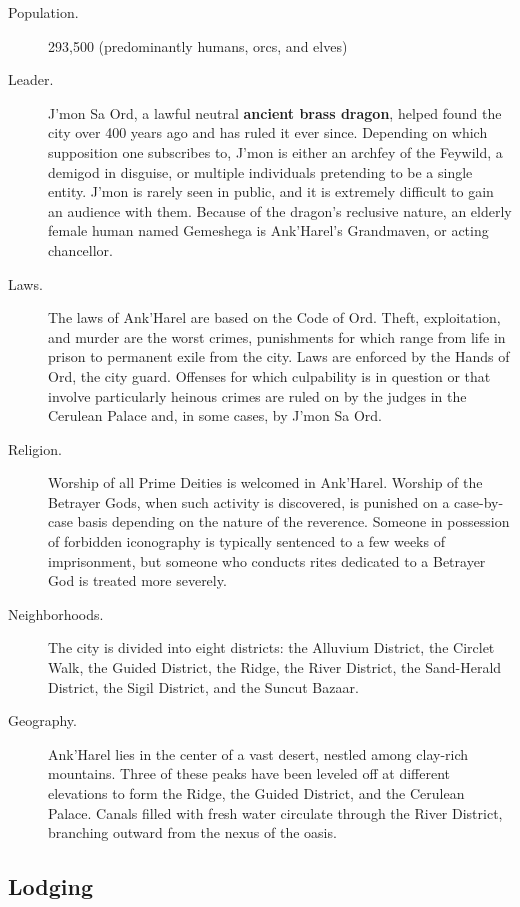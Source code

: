 \documentclass[letterpaper, 11pt, bg=full, twocolumn]{dndbook}
\begin{document}
\begin{description}
\item[Population.] 293,500 (predominantly humans, orcs, and elves)
\item[Leader.] J'mon Sa Ord, a lawful neutral \textbf{ancient brass dragon}, helped found the city over 400 years ago and has ruled it ever since. Depending on which supposition one subscribes to, J'mon is either an archfey of the Feywild, a demigod in disguise, or multiple individuals pretending to be a single entity. J'mon is rarely seen in public, and it is extremely difficult to gain an audience with them. Because of the dragon's reclusive nature, an elderly female human named Gemeshega is Ank'Harel's Grandmaven, or acting chancellor.
\item[Laws.] The laws of Ank'Harel are based on the Code of Ord. Theft, exploitation, and murder are the worst crimes, punishments for which range from life in prison to permanent exile from the city. Laws are enforced by the Hands of Ord, the city guard. Offenses for which culpability is in question or that involve particularly heinous crimes are ruled on by the judges in the Cerulean Palace and, in some cases, by J'mon Sa Ord.
\item[Religion.] Worship of all Prime Deities is welcomed in Ank'Harel. Worship of the Betrayer Gods, when such activity is discovered, is punished on a case-by-case basis depending on the nature of the reverence. Someone in possession of forbidden iconography is typically sentenced to a few weeks of imprisonment, but someone who conducts rites dedicated to a Betrayer God is treated more severely.
\item[Neighborhoods.] The city is divided into eight districts: the Alluvium District, the Circlet Walk, the Guided District, the Ridge, the River District, the Sand-Herald District, the Sigil District, and the Suncut Bazaar.
\item[Geography.] Ank'Harel lies in the center of a vast desert, nestled among clay-rich mountains. Three of these peaks have been leveled off at different elevations to form the Ridge, the Guided District, and the Cerulean Palace. Canals filled with fresh water circulate through the River District, branching outward from the nexus of the oasis.
\end{description}



\subsection{Lodging}
\end{document}
